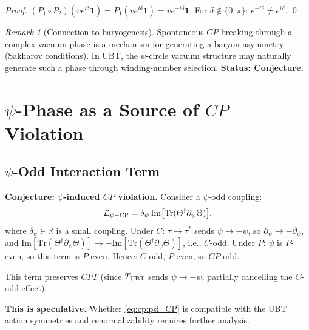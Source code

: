 \documentclass[12pt,a4paper]{article}
\theoremstyle{definition}
\theoremstyle{remark}
\newtheorem{remark}[theorem]{Remark}
\begin{document}
\begin{proof}
$(P_1\circ P_2)(ve^{i\delta}\mathbf{1}) = P_1(ve^{i\delta}\mathbf{1})
= ve^{-i\delta}\mathbf{1}$.
For $\delta\notin\{0,\pi\}$: $e^{-i\delta}\neq e^{i\delta}$. \qed
\end{proof}

\begin{remark}[Connection to baryogenesis]
Spontaneous $CP$ breaking through a complex vacuum phase is a mechanism
for generating a baryon asymmetry (Sakharov conditions).  In UBT,
the $\psi$-circle vacuum structure may naturally generate such a phase
through winding-number selection.  \textbf{Status: Conjecture.}
\end{remark}

\section{$\psi$-Phase as a Source of $CP$ Violation}
\label{sec:cp:psi}

\subsection{$\psi$-Odd Interaction Term}

\begin{conjecturebox}
\textbf{Conjecture: $\psi$-induced $CP$ violation.}
Consider a $\psi$-odd coupling:
\begin{equation}
  \mathcal{L}_{\psi\rm -CP}
  = \delta_\psi\,\mathrm{Im}\bigl[\mathrm{Tr}(\Theta^\dagger \partial_\psi\Theta)\bigr],
  \label{eq:cp:psi_CP}
\end{equation}
where $\delta_\psi\in\mathbb{R}$ is a small coupling.
Under $C$: $\tau\to\tau^*$ sends $\psi\to-\psi$, so
$\partial_\psi\to -\partial_\psi$, and
$\mathrm{Im}[\mathrm{Tr}(\Theta^\dagger\partial_\psi\Theta)]\to
-\mathrm{Im}[\mathrm{Tr}(\Theta^\dagger\partial_\psi\Theta)]$, i.e., $C$-odd.
Under $P$: $\psi$ is $P$-even, so this term is $P$-even.
Hence: $C$-odd, $P$-even, so $CP$-odd.

This term preserves $CPT$ (since $T_{\rm UBT}$ sends $\psi\to-\psi$,
partially cancelling the $C$-odd effect).

\textbf{This is speculative.}  Whether \eqref{eq:cp:psi_CP} is compatible with
the UBT action symmetries and renormalizability requires further analysis.
\end{conjecturebox}
\end{document}
